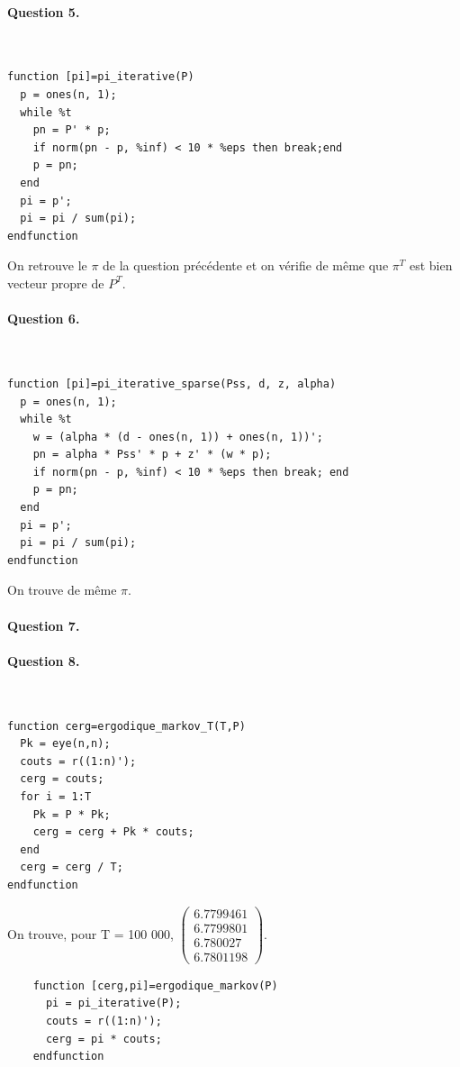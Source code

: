\documentclass[12pt,a4paper]{article}
\begin{document}
\paragraph*{Question 5.}
~
\begin{lstlisting}
function [pi]=pi_iterative(P)
  p = ones(n, 1);
  while %t
    pn = P' * p;
    if norm(pn - p, %inf) < 10 * %eps then break;end
    p = pn;
  end
  pi = p';
  pi = pi / sum(pi);
endfunction
\end{lstlisting}

On retrouve le $\pi$ de la question précédente et on vérifie de même que $\pi^T$ est bien vecteur propre de $P^T$.

\paragraph*{Question 6.}
~
\begin{lstlisting}
function [pi]=pi_iterative_sparse(Pss, d, z, alpha)
  p = ones(n, 1);
  while %t
    w = (alpha * (d - ones(n, 1)) + ones(n, 1))';
    pn = alpha * Pss' * p + z' * (w * p);
    if norm(pn - p, %inf) < 10 * %eps then break; end
    p = pn;
  end
  pi = p';
  pi = pi / sum(pi);
endfunction
\end{lstlisting}

On trouve de même $\pi$.

\paragraph*{Question 7.}

\paragraph*{Question 8.}
~
\begin{lstlisting}
function cerg=ergodique_markov_T(T,P)
  Pk = eye(n,n);
  couts = r((1:n)');
  cerg = couts;
  for i = 1:T
    Pk = P * Pk;
    cerg = cerg + Pk * couts;
  end
  cerg = cerg / T;
endfunction
\end{lstlisting}

On trouve, pour T = 100 000, $\begin{pmatrix} 6.7799461 \\ 6.7799801 \\ 6.780027 \\ 6.7801198 \end{pmatrix}$.

\begin{lstlisting}
    function [cerg,pi]=ergodique_markov(P)
      pi = pi_iterative(P);
      couts = r((1:n)');
      cerg = pi * couts;
    endfunction
\end{lstlisting}
\end{document}
